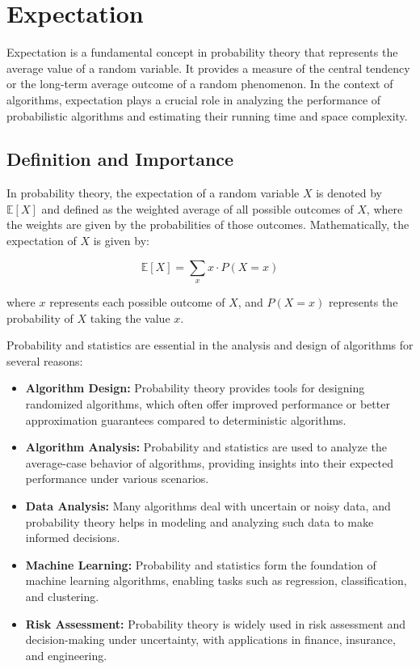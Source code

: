 \documentclass[12pt]{book} %
\begin{document}
\section{Expectation}

Expectation is a fundamental concept in probability theory that represents the average value of a random variable. It provides a measure of the central tendency or the long-term average outcome of a random phenomenon. In the context of algorithms, expectation plays a crucial role in analyzing the performance of probabilistic algorithms and estimating their running time and space complexity.

\subsection{Definition and Importance}

In probability theory, the expectation of a random variable \(X\) is denoted by \(\mathbb{E}[X]\) and defined as the weighted average of all possible outcomes of \(X\), where the weights are given by the probabilities of those outcomes. Mathematically, the expectation of \(X\) is given by:

\[
\mathbb{E}[X] = \sum_{x} x \cdot P(X=x)
\]

where \(x\) represents each possible outcome of \(X\), and \(P(X=x)\) represents the probability of \(X\) taking the value \(x\).


Probability and statistics are essential in the analysis and design of algorithms for several reasons:

\begin{itemize}
    \item \textbf{Algorithm Design:} Probability theory provides tools for designing randomized algorithms, which often offer improved performance or better approximation guarantees compared to deterministic algorithms.
    
    \item \textbf{Algorithm Analysis:} Probability and statistics are used to analyze the average-case behavior of algorithms, providing insights into their expected performance under various scenarios.
    
    \item \textbf{Data Analysis:} Many algorithms deal with uncertain or noisy data, and probability theory helps in modeling and analyzing such data to make informed decisions.
    
    \item \textbf{Machine Learning:} Probability and statistics form the foundation of machine learning algorithms, enabling tasks such as regression, classification, and clustering.
    
    \item \textbf{Risk Assessment:} Probability theory is widely used in risk assessment and decision-making under uncertainty, with applications in finance, insurance, and engineering.
\end{itemize}
\end{document}
